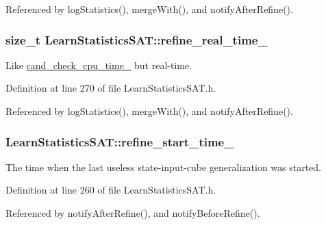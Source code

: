 Referenced by log\-Statistics(), merge\-With(), and notify\-After\-Refine().

\hypertarget{classLearnStatisticsSAT_aa36efa6b1b2bfef8ca65095952c5c35e}{
\subsubsection[{refine\-\_\-real\-\_\-time\-\_\-}]{\setlength{\rightskip}{0pt plus 5cm}size\-\_\-t Learn\-Statistics\-S\-A\-T\-::refine\-\_\-real\-\_\-time\-\_\-\hspace{0.3cm}{\ttfamily [protected]}}}\label{classLearnStatisticsSAT_aa36efa6b1b2bfef8ca65095952c5c35e}


Like \hyperlink{classLearnStatisticsSAT_a2ab5cd522b7a4d700a11c0bb430baa81}{cand\-\_\-check\-\_\-cpu\-\_\-time\-\_\-} but real-\/time. 



Definition at line 270 of file Learn\-Statistics\-S\-A\-T.\-h.



Referenced by log\-Statistics(), merge\-With(), and notify\-After\-Refine().

\hypertarget{classLearnStatisticsSAT_af358ee7d57095acbb602d9b9e1329dd2}{
\subsubsection[{refine\-\_\-start\-\_\-time\-\_\-}]{ Learn\-Statistics\-S\-A\-T\-::refine\-\_\-start\-\_\-time\-\_\-\hspace{0.3cm}{\ttfamily [protected]}}}\label{classLearnStatisticsSAT_af358ee7d57095acbb602d9b9e1329dd2}


The time when the last useless state-\/input-\/cube generalization was started. 



Definition at line 260 of file Learn\-Statistics\-S\-A\-T.\-h.



Referenced by notify\-After\-Refine(), and notify\-Before\-Refine().

